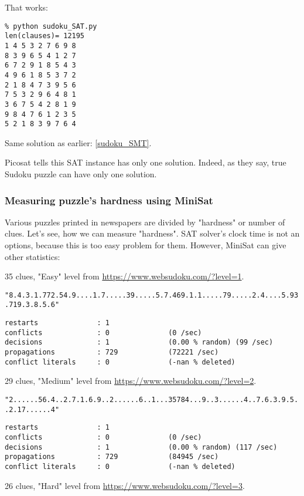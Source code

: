 That works:

\begin{lstlisting}
% python sudoku_SAT.py
len(clauses)= 12195
1 4 5 3 2 7 6 9 8
8 3 9 6 5 4 1 2 7
6 7 2 9 1 8 5 4 3
4 9 6 1 8 5 3 7 2
2 1 8 4 7 3 9 5 6
7 5 3 2 9 6 4 8 1
3 6 7 5 4 2 8 1 9
9 8 4 7 6 1 2 3 5
5 2 1 8 3 9 7 6 4
\end{lstlisting}

Same solution as earlier: \ref{sudoku_SMT}.

Picosat tells this SAT instance has only one solution.
Indeed, as they say, true Sudoku puzzle can have only one solution.

\subsubsection{Measuring puzzle's hardness using MiniSat}

Various puzzles printed in newspapers are divided by "hardness" or number of clues.
Let's see, how we can measure "hardness".
SAT solver's clock time is not an options, because this is too easy problem for them.
However, MiniSat can give other statistics:

35 clues, "Easy" level from \url{https://www.websudoku.com/?level=1}.

\verb|"8.4.3.1.772.54.9....1.7.....39.....5.7.469.1.1.....79.....2.4....5.93.719.3.8.5.6"|

\begin{lstlisting}
restarts              : 1
conflicts             : 0              (0 /sec)
decisions             : 1              (0.00 % random) (99 /sec)
propagations          : 729            (72221 /sec)
conflict literals     : 0              (-nan % deleted)
\end{lstlisting}

29 clues, "Medium" level from \url{https://www.websudoku.com/?level=2}.

\verb|"2......56.4..2.7.1.6.9..2......6..1...35784...9..3......4..7.6.3.9.5..2.17......4"|

\begin{lstlisting}
restarts              : 1
conflicts             : 0              (0 /sec)
decisions             : 1              (0.00 % random) (117 /sec)
propagations          : 729            (84945 /sec)
conflict literals     : 0              (-nan % deleted)
\end{lstlisting}

26 clues, "Hard" level from \url{https://www.websudoku.com/?level=3}.


